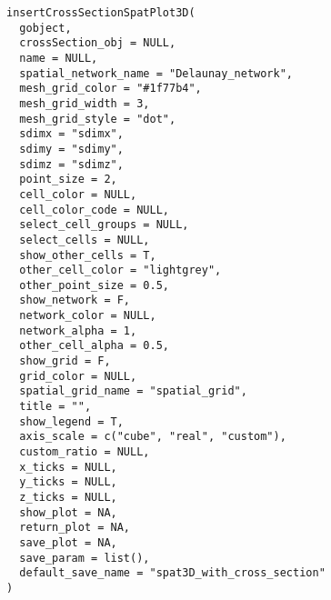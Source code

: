 \documentclass[a4paper]{book}
\begin{document}
\begin{Usage}
\begin{verbatim}
insertCrossSectionSpatPlot3D(
  gobject,
  crossSection_obj = NULL,
  name = NULL,
  spatial_network_name = "Delaunay_network",
  mesh_grid_color = "#1f77b4",
  mesh_grid_width = 3,
  mesh_grid_style = "dot",
  sdimx = "sdimx",
  sdimy = "sdimy",
  sdimz = "sdimz",
  point_size = 2,
  cell_color = NULL,
  cell_color_code = NULL,
  select_cell_groups = NULL,
  select_cells = NULL,
  show_other_cells = T,
  other_cell_color = "lightgrey",
  other_point_size = 0.5,
  show_network = F,
  network_color = NULL,
  network_alpha = 1,
  other_cell_alpha = 0.5,
  show_grid = F,
  grid_color = NULL,
  spatial_grid_name = "spatial_grid",
  title = "",
  show_legend = T,
  axis_scale = c("cube", "real", "custom"),
  custom_ratio = NULL,
  x_ticks = NULL,
  y_ticks = NULL,
  z_ticks = NULL,
  show_plot = NA,
  return_plot = NA,
  save_plot = NA,
  save_param = list(),
  default_save_name = "spat3D_with_cross_section"
)
\end{verbatim}
\end{Usage}
%
\end{document}
